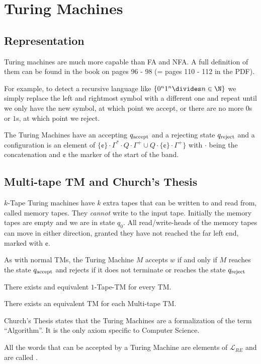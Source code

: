\newsection
\section{Turing Machines}
\setcounter{subsection}{2}
\subsection{Representation}
Turing machines are much more capable than FA and NFA. A full definition of them can be found in the book on pages 96 - 98 (= pages 110 - 112 in the PDF).

For example, to detect a recursive language like $\{ 0^n 1^n \divides n \in \N \}$ we simply replace the left and rightmost symbol with a different one
and repeat until we only have the new symbol, at which point we accept, or there are no more $0$s or $1$s, at which point we reject.

The Turing Machines have an accepting $q_{\text{accept}}$ and a rejecting state $q_{\text{reject}}$ and a configuration is an element of
$\{ \cent \}\cdot \Gamma^* \cdot Q \cdot \Gamma^+ \cup Q \cdot \{ \cent \} \cdot \Gamma^+ \}$ with $\cdot$ being the concatenation and $\cent$ the marker of the start of the band.


\subsection{Multi-tape TM and Church's Thesis}
$k$-Tape Turing machines have $k$ extra tapes that can be written to and read from, called memory tapes. They \textit{cannot} write to the input tape.
Initially the memory tapes are empty and we are in state $q_0$.
All read/write-heads of the memory tapes can move in either direction, granted they have not reached the far left end, marked with $\cent$.

As with normal TMs, the Turing Machine $M$ accepts $w$ if and only if $M$ reaches the state $q_{\text{accept}}$ and rejects if it does not terminate or reaches the state $q_{\text{reject}}$

\inlinelemma There exists and equivalent $1$-Tape-TM for every TM.

\inlinelemma There exists an equivalent TM for each Multi-tape TM.


Church's Thesis states that the Turing Machines are a formalization of the term ``Algorithm''.
It is the only axiom specific to Computer Science.

All the words that can be accepted by a Turing Machine are elements of $\mathcal{L}_{RE}$ and are called .


